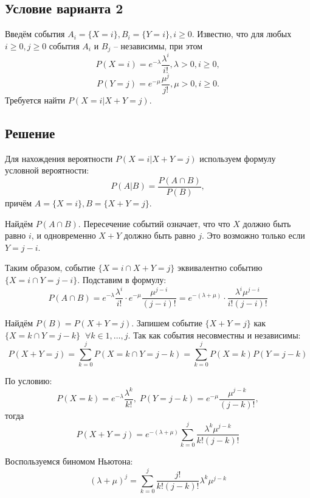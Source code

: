 \documentclass[a4paper,14pt]{extarticle}
\begin{document}
        \subsection*{Условие варианта 2}
            
            Введём события \( A_i = \{X = i\}, B_i = \{Y = i\}, i \geq 0 \). Известно, что для любых \( i \geq 0, j \geq 0 \) события \( A_i \) и \( B_j \) -- независимы, при этом
            \[ P(X = i) = e^{-\lambda} \frac{\lambda^i}{i!}, \lambda > 0, i \geq 0, \]
            \[ P(Y = j) = e^{-\mu} \frac{\mu^j}{j!}, \mu > 0, i \geq 0. \]
            Требуется найти \( P(X = i | X + Y = j) \).
        
        \subsection*{Решение}
            
            Для нахождения вероятности \( P(X = i | X + Y = j) \) используем формулу условной вероятности:
            \[ P(A|B) = \frac{P( A \cap B)}{P(B)}, \]
            причём \(A = \{X = i\}, B = \{X + Y = j\}\).
            
            Найдём \(P( A \cap B)\). Пересечение событий означает, что что \(X\) должно быть равно \(i\), и одновременно \(X+Y\) должно быть равно \(j\). Это возможно только если \(Y=j-i\).
            
            Таким образом, событие \(\{X = i \cap X + Y = j\}\) эквивалентно событию \(\{X = i \cap Y = j - i\}\). Подставим в формулу:
            \[P(A \cap B ) =  e^{-\lambda} \frac{\lambda^i}{i!} \cdot e^{-\mu} \frac{\mu^{j-i}}{(j-i)!} = e^{-(\lambda + \mu)} \cdot \frac{\lambda^i \mu^{j-i}}{i!(j-i)!}\]
            
            Найдём \(P(B) = P(X + Y = j) \). Запишем событие \(\{X + Y = j\}\) как \(\{X = k \cap Y = j-k\} \;\; \forall k \in {1, \dots, j}\). Так как события несовместны и независимы:
            \[ P(X + Y = j) = \sum_{k=0}^{j} P(X = k \cap Y = j-k) = \sum_{k=0}^{j}P(X = k) P(Y = j - k)\]
            
            По условию:
            \[P(X = k) = e^{-\lambda} \frac{\lambda^k}{k!}, \; P(Y = j - k) = e^{-\mu} \frac{\mu^{j-k}}{(j-k)!}, \]
            тогда
            \[ P(X + Y = j) = e^{-(\lambda + \mu)} \sum_{k=0}^{j} \frac{\lambda^k \mu^{j-k}}{k!(j-k)!} \]
            
            Воспользуемся биномом Ньютона: \[(\lambda + \mu)^j = \sum_{k=0}^{j} \frac{j!}{k!(j-k)!} \lambda^k \mu^{j-k}\]
            
\end{document}
